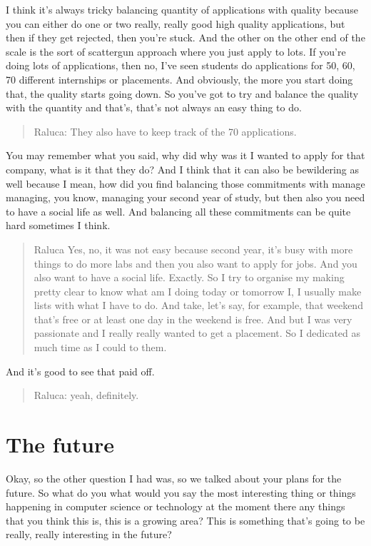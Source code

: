 \documentclass[
]{book}
\begin{document}
I think it's always tricky balancing quantity of applications with quality because you can either do one or two really, really good high quality applications, but then if they get rejected, then you're stuck. And the other on the other end of the scale is the sort of scattergun approach where you just apply to lots. If you're doing lots of applications, then no, I've seen students do applications for 50, 60, 70 different internships or placements. And obviously, the more you start doing that, the quality starts going down. So you've got to try and balance the quality with the quantity and that's, that's not always an easy thing to do.

\begin{quote}
Raluca: They also have to keep track of the 70 applications.
\end{quote}

You may remember what you said, why did why was it I wanted to apply for that company, what is it that they do? And I think that it can also be bewildering as well because I mean, how did you find balancing those commitments with manage managing, you know, managing your second year of study, but then also you need to have a social life as well. And balancing all these commitments can be quite hard sometimes I think.

\begin{quote}
Raluca Yes, no, it was not easy because second year, it's busy with more things to do more labs and then you also want to apply for jobs. And you also want to have a social life. Exactly. So I try to organise my making pretty clear to know what am I doing today or tomorrow I, I usually make lists with what I have to do. And take, let's say, for example, that weekend that's free or at least one day in the weekend is free. And but I was very passionate and I really really wanted to get a placement. So I dedicated as much time as I could to them.
\end{quote}

And it's good to see that paid off.

\begin{quote}
Raluca: yeah, definitely.
\end{quote}

\hypertarget{the-future}{%
\section{The future}\label{the-future}}

Okay, so the other question I had was, so we talked about your plans for the future. So what do you what would you say the most interesting thing or things happening in computer science or technology at the moment there any things that you think this is, this is a growing area? This is something that's going to be really, really interesting in the future?
\end{document}
